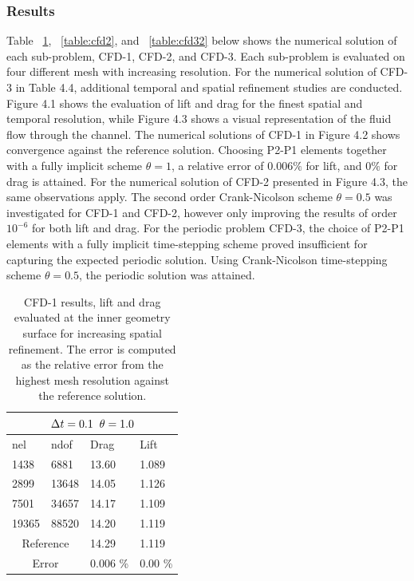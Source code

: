 \subsubsection*{Results}
Table ~\ref{table:cfd1}, ~\ref{table:cfd2}, and ~\ref{table:cfd32} below shows the numerical solution of each sub-problem, CFD-1, CFD-2, and CFD-3. Each sub-problem is evaluated on four different mesh with increasing resolution. For the numerical solution of CFD-3 in Table 4.4, additional temporal and spatial refinement studies are conducted. Figure 4.1 shows the evaluation of lift and drag for the finest spatial and temporal resolution, while Figure 4.3 shows a visual representation of the fluid flow through the channel. The numerical solutions of CFD-1 in Figure 4.2 shows convergence against the reference solution. Choosing P2-P1 elements together with a fully implicit scheme $\theta = 1$, a relative error of $0.006 \%$ for lift, and $0\%$ for drag is attained. For the numerical solution of CFD-2 presented in Figure 4.3, the same observations apply. The second order Crank-Nicolson scheme  $\theta = 0.5$ was investigated for CFD-1 and CFD-2, however only improving the results of order $10^{-6}$ for both lift and drag. For the periodic problem CFD-3, the choice of  P2-P1 elements with a fully implicit time-stepping scheme proved insufficient for capturing the expected periodic solution. Using Crank-Nicolson time-stepping scheme $\theta = 0.5$, the periodic solution was attained. 
\begin{table}[h!]
\centering
\begin{tabular}{ |p{1cm}||p{2.7cm}|p{3.3cm}|p{3.3cm}|}
\hline
  \multicolumn{4}{|c|}{$\Delta t = 0.1 \hspace{2mm} \theta = 1.0$} \\
\hline
nel & ndof & Drag  & Lift \\
\hline
 1438    & 6881   & 13.60 & 1.089  \\
 2899    & 13648  & 14.05 & 1.126 \\
 7501    & 34657  & 14.17   & 1.109 \\
 19365   & 88520  & 14.20 & 1.119 \\
  \hline
  \multicolumn{2}{|c|}{Reference}  & 14.29   & 1.119\\
   \hline
    \multicolumn{2}{|c|}{Error}  & 0.006 \%   & 0.00 \%\\
   \hline
\end{tabular}
\caption{CFD-1 results, lift and drag evaluated at the inner geometry surface for increasing spatial refinement. The error is computed as the relative error from the highest mesh resolution against the reference solution.}
\label{table:cfd1}
\end{table}
